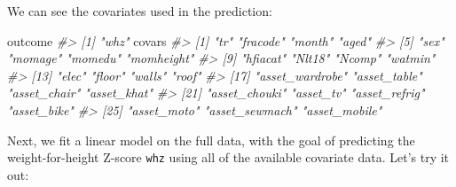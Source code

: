\documentclass[12pt, krantz2,]{book}
\newenvironment{Shaded}{\begin{snugshade}}{\end{snugshade}}
\newcommand{\CommentTok}[1]{\textcolor[rgb]{0.56,0.35,0.01}{\textit{#1}}}
\newcommand{\NormalTok}[1]{#1}
\theoremstyle{definition}
\theoremstyle{definition}
\theoremstyle{definition}
\newcommand{\1}{\mathbbm{1}}
\begin{document}
We can see the covariates used in the prediction:

\begin{Shaded}
\begin{Highlighting}[]
\NormalTok{outcome}
\CommentTok{#> [1] "whz"}
\NormalTok{covars}
\CommentTok{#>  [1] "tr"             "fracode"        "month"          "aged"          }
\CommentTok{#>  [5] "sex"            "momage"         "momedu"         "momheight"     }
\CommentTok{#>  [9] "hfiacat"        "Nlt18"          "Ncomp"          "watmin"        }
\CommentTok{#> [13] "elec"           "floor"          "walls"          "roof"          }
\CommentTok{#> [17] "asset_wardrobe" "asset_table"    "asset_chair"    "asset_khat"    }
\CommentTok{#> [21] "asset_chouki"   "asset_tv"       "asset_refrig"   "asset_bike"    }
\CommentTok{#> [25] "asset_moto"     "asset_sewmach"  "asset_mobile"}
\end{Highlighting}
\end{Shaded}

Next, we fit a linear model on the full data, with the goal of predicting the
weight-for-height Z-score \texttt{whz} using all of the available covariate data. Let's
try it out:
\end{document}

